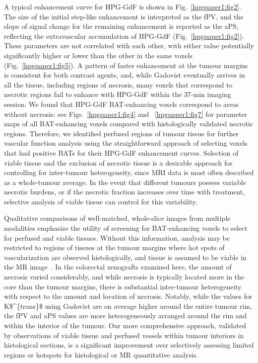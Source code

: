 A typical enhancement curve for \acs{HPG-GdF} is shown in Fig.~\ref{hpgpaper1:fig2}.
The size of the initial step-like enhancement is interpreted as the \acs{fPV}, and the slope of signal change for the remaining enhancement is reported as the \acs{aPS}, reflecting the extravascular accumulation of \acs{HPG-GdF} (Fig.~\ref{hpgpaper1:fig2}).
These parameters are not correlated with each other, with either value potentially significantly higher or lower than the other in the same voxels (Fig.~\ref{hpgpaper1:fig5}).
A pattern of faster enhancement at the tumour margins is consistent for both contrast agents, and, while Gadovist eventually arrives in all the tissue, including regions of necrosis, many voxels that correspond to necrotic regions fail to enhance with \acs{HPG-GdF} within the 37-min imaging session.
We found that \acs{HPG-GdF} \acs{BAT}-enhancing voxels correspond to areas without necrosis: see Figs.~\ref{hpgpaper1:fig4} and ~\ref{hpgpaper1:fig7} for parameter maps of all \acs{BAT}-enhancing voxels compared with histologically validated necrotic regions.
Therefore, we identified perfused regions of tumour tissue for further vascular function analysis using the straightforward approach of selecting voxels that had positive \acs{BAT}s for their \acs{HPG-GdF} enhancement curves.
Selection of viable tissue and the exclusion of necrotic tissue is a desirable approach for controlling for inter-tumour heterogeneity, since MRI data is most often described as a whole-tumour average.
In the event that different tumours possess variable necrotic burdens, or if the necrotic fraction increases over time with treatment, selective analysis of viable tissue can control for this variability.

Qualitative comparisons of well-matched, whole-slice images from multiple modalities emphasize the utility of screening for \acs{BAT}-enhancing voxels to select for perfused and viable tissues.
Without this information, analysis may be restricted to regions of tissues at the tumour margins where hot spots of vascularization are observed histologically, and tissue is assumed to be viable in the MR image~\cite{Pathak:2005gu,Li:2005gw}.
In the colorectal xenografts examined here, the amount of necrosis varied considerably, and while necrosis is typically located more in the core than the tumour margins, there is substantial inter-tumour heterogeneity with respect to the amount and location of necrosis.
Notably, while the values for \acs{K$^{trans}$} using Gadovist are on average higher around the entire tumour rim, the \acs{fPV} and \acs{aPS} values are more heterogeneously arranged around the rim and within the interior of the tumour.
Our more comprehensive approach, validated by observations of viable tissue and perfused vessels within tumour interiors in histological sections, is a significant improvement over selectively assessing limited regions or hotspots for histological or MR quantitative analysis.

